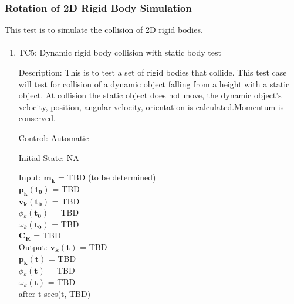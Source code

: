 \documentclass[12pt, titlepage]{article}
\begin{document}

\subsubsection{Rotation of 2D Rigid Body Simulation}
This test is to simulate the collision of 2D rigid bodies.
\paragraph{}
\begin{enumerate}
	
	\item{TC5: Dynamic rigid body collision with static body test\\}
	
	Description: This is to test a set of rigid bodies that collide. This test case will test for collision of a dynamic object falling from a height with a static object. At collision the static object does not move, the dynamic object's velocity, position, angular velocity, orientation is calculated.Momentum is conserved.
	
	Control: Automatic
	
	Initial State: NA
	
	Input: $\mathbf{m_k}$$\mathbf{}$ = TBD (to be determined)\\
	\hspace*{1.3cm}$\mathbf{p_k}$$\mathbf{(t_0)}$ = TBD\\
	\hspace*{1.3cm}$\mathbf{v_k}$$\mathbf{(t_0)}$ = TBD\\
	\hspace*{1.3cm}$\phi$$_k\mathbf{(t_0)}$ = TBD\\
	\hspace*{1.3cm}$\omega$$_k\mathbf{(t_0)}$$ \mathbf{}$ = TBD\\
	\hspace*{1.3cm}$\mathbf{C_R}$$\mathbf{}$ = TBD \\
	
	
	Output:  $\mathbf{v_k}$$\mathbf{(t)}$ = TBD \\
	\hspace*{1.3cm}$\mathbf{p_k}$$\mathbf{(t)}$ = TBD\\
	\hspace*{1.3cm}$\phi$$_k\mathbf{(t)}$ = TBD\\
	\hspace*{1.3cm}$\omega$$_k\mathbf{(t)}$$ \mathbf{}$ = TBD\\
	 after t secs(t, TBD) 
	 

\end{enumerate}
\end{document}
